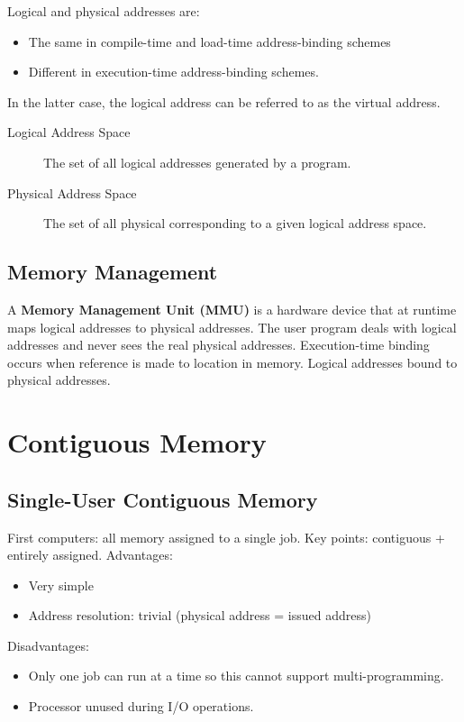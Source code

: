 \documentclass[11pt]{article}
\begin{document}
Logical and physical addresses are:
\begin{itemize}
\item The same in compile-time and load-time address-binding schemes
\item Different in execution-time address-binding schemes.
\end{itemize}
In the latter case, the logical address can be referred to as the virtual address.
\begin{description}
\item[{Logical Address Space}] The set of all logical addresses generated by a program.
\item[{Physical Address Space}] The set of all physical corresponding to a given logical address space.
\end{description}

\subsection{Memory Management}
\label{sec:orgbf3b48d}
A \textbf{Memory Management Unit (MMU)} is a hardware device that at runtime maps logical addresses to physical addresses.
The user program deals with logical addresses and never sees the real physical addresses.
Execution-time binding occurs when reference is made to location in memory.
Logical addresses bound to physical addresses.

\section{Contiguous Memory}
\label{sec:org0ae368c}
\subsection{Single-User Contiguous Memory}
\label{sec:org202f26e}
First computers: all memory assigned to a single job.
Key points: contiguous + entirely assigned.
Advantages:
\begin{itemize}
\item Very simple
\item Address resolution: trivial (physical address = issued address)
\end{itemize}
Disadvantages:
\begin{itemize}
\item Only one job can run at a time so this cannot support multi-programming.
\item Processor unused during I/O operations.
\end{itemize}
\end{document}
